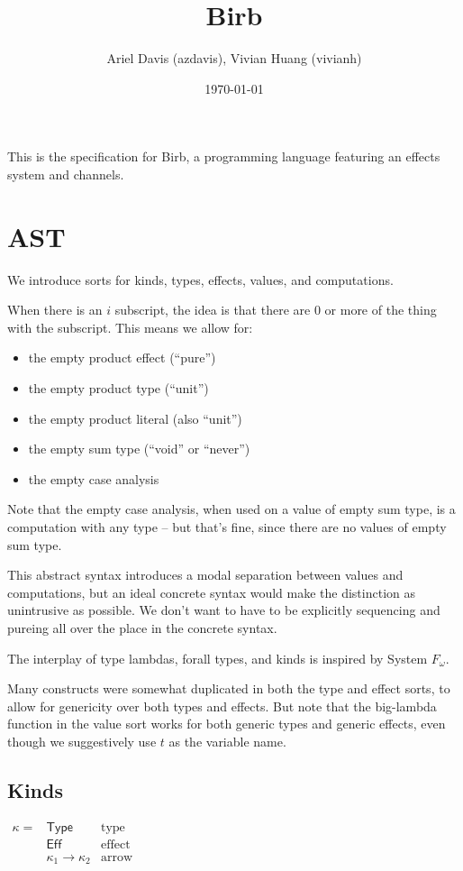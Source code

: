 \documentclass[12pt]{article}
\title{Birb}
\author{Ariel Davis (azdavis), Vivian Huang (vivianh)}
\date{\today}
\begin{document}
\maketitle

This is the specification for Birb, a programming language featuring an effects
system and channels.

\newpage
\section{AST}

We introduce sorts for kinds, types, effects, values, and computations.

When there is an $i$ subscript, the idea is that there are 0 or more of the
thing with the subscript. This means we allow for:
\begin{itemize}
\item the empty product effect (``pure'')
\item the empty product type (``unit'')
\item the empty product literal (also ``unit'')
\item the empty sum type (``void'' or ``never'')
\item the empty case analysis
\end{itemize}

Note that the empty case analysis, when used on a value of empty sum type, is a
computation with any type -- but that's fine, since there are no values of empty
sum type.

This abstract syntax introduces a modal separation between values and
computations, but an ideal concrete syntax would make the distinction as
unintrusive as possible. We don't want to have to be explicitly sequencing and
\textsf{pure}ing all over the place in the concrete syntax.

The interplay of type lambdas, forall types, and kinds is inspired by System
$F_\omega$.

Many constructs were somewhat duplicated in both the type and effect sorts, to
allow for genericity over both types and effects. But note that the big-lambda
function in the value sort works for both generic types and generic effects,
even though we suggestively use $t$ as the variable name.

\subsection{Kinds}

$\begin{array}{lll}
\kappa =
  & \textsf{Type}                 & \text{type} \\
  & \textsf{Eff}                  & \text{effect} \\
  & \kappa_1 \rightarrow \kappa_2 & \text{arrow}
\end{array}$
\end{document}
